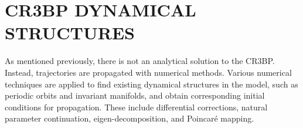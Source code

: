 \chapter{CR3BP DYNAMICAL STRUCTURES}

As mentioned previously, there is not an analytical solution to the CR3BP. Instead,
trajectories are propagated with numerical methods. Various numerical techniques are applied to
find existing dynamical structures in the model, such as periodic orbits and invariant manifolds,
and obtain corresponding initial conditions for propagation. These include differential
corrections, natural parameter continuation, eigen-decomposition, and Poincar\'e mapping.





